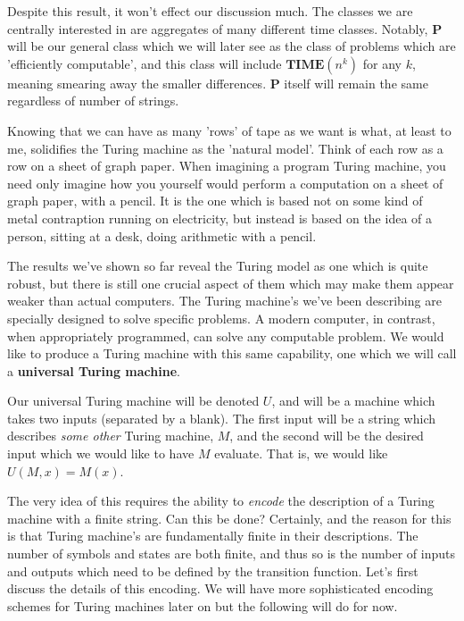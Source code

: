 \documentclass{article}
\theoremstyle{definition}
\theoremstyle{plain}
\theoremstyle{theorem}
\begin{document}
Despite this result, it won't effect our discussion much. The classes we are centrally interested in are aggregates of many different time classes. Notably, $\bm{P}$ will be our general class which we will later see as the class of problems which are 'efficiently computable', and this class will include $\bm{TIME}(n^k)$ for any $k$, meaning smearing away the smaller differences. $\bm{P}$ itself will remain the same regardless of number of strings. \par 
Knowing that we can have as many 'rows' of tape as we want is what, at least to me, solidifies the Turing machine as the 'natural model'. Think of each row as a row on a sheet of graph paper. When imagining a program Turing machine, you need only imagine how you yourself would perform a computation on a sheet of graph paper, with a pencil. It is the one which is based not on some kind of metal contraption running on electricity, but instead is based on the idea of a person, sitting at a desk, doing arithmetic with a pencil. \par 
The results we've shown so far reveal the Turing model as one which is quite robust, but there is still one crucial aspect of them which may make them appear weaker than actual computers. The Turing machine's we've been describing are specially designed to solve specific problems. A modern computer, in contrast, when appropriately programmed, can solve any computable problem. We would like to produce a Turing machine with this same capability, one which we will call a \textbf{universal Turing machine}. \par 
Our universal Turing machine will be denoted $U$, and will be a machine which takes two inputs (separated by a blank). The first input will be a string which describes \textit{some other} Turing machine, $M$, and the second will be the desired input which we would like to have $M$ evaluate. That is, we would like $U(M,x) = M(x)$. \par 
The very idea of this requires the ability to \textit{encode} the description of a Turing machine with a finite string. Can this be done? Certainly, and the reason for this is that Turing machine's are fundamentally finite in their descriptions. The number of symbols and states are both finite, and thus so is the number of inputs and outputs which need to be defined by the transition function. Let's first discuss the details of this encoding. We will have more sophisticated encoding schemes for Turing machines later on but the following will do for now. \par 
\end{document}
